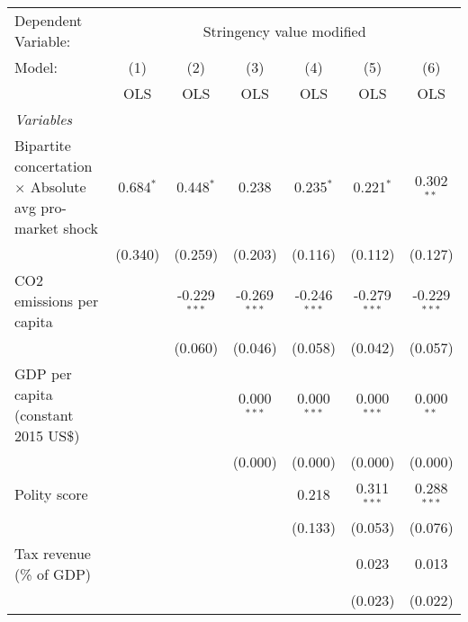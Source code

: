 
\begingroup
\centering
\begin{tabular}{lcccccc}
   \toprule
   Dependent Variable: & \multicolumn{6}{c}{Stringency value modified}\\
   Model:                                                         & (1)         & (2)            & (3)            & (4)            & (5)            & (6)\\  
                                                                  &  OLS        & OLS            & OLS            & OLS            & OLS            & OLS\\  
   \midrule
   \emph{Variables}\\
   Bipartite concertation $\times$ Absolute avg pro-market shock  & 0.684$^{*}$ & 0.448$^{*}$    & 0.238          & 0.235$^{*}$    & 0.221$^{*}$    & 0.302$^{**}$\\   
                                                                  & (0.340)     & (0.259)        & (0.203)        & (0.116)        & (0.112)        & (0.127)\\   
   CO2 emissions per capita                                       &             & -0.229$^{***}$ & -0.269$^{***}$ & -0.246$^{***}$ & -0.279$^{***}$ & -0.229$^{***}$\\   
                                                                  &             & (0.060)        & (0.046)        & (0.058)        & (0.042)        & (0.057)\\   
   GDP per capita (constant 2015 US\$)                            &             &                & 0.000$^{***}$  & 0.000$^{***}$  & 0.000$^{***}$  & 0.000$^{**}$\\   
                                                                  &             &                & (0.000)        & (0.000)        & (0.000)        & (0.000)\\   
   Polity score                                                   &             &                &                & 0.218          & 0.311$^{***}$  & 0.288$^{***}$\\   
                                                                  &             &                &                & (0.133)        & (0.053)        & (0.076)\\   
   Tax revenue (\% of GDP)                                        &             &                &                &                & 0.023          & 0.013\\   
                                                                  &             &                &                &                & (0.023)        & (0.022)\\   

\end{tabular}
